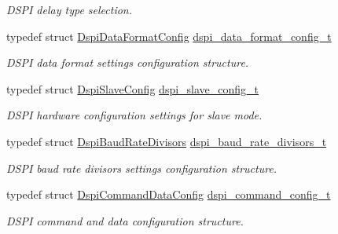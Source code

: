 \begin{DoxyCompactItemize}
\begin{DoxyCompactList}\small\item\em D\+S\+PI delay type selection. \end{DoxyCompactList}\item 
typedef struct \hyperlink{structDspiDataFormatConfig}{Dspi\+Data\+Format\+Config} \hyperlink{group__dspi__hal_ga0eeb6e5b9b331a951edcf24c269bdfcd}{dspi\+\_\+data\+\_\+format\+\_\+config\+\_\+t}
\begin{DoxyCompactList}\small\item\em D\+S\+PI data format settings configuration structure. \end{DoxyCompactList}\item 
typedef struct \hyperlink{structDspiSlaveConfig}{Dspi\+Slave\+Config} \hyperlink{group__dspi__hal_gad42506023f30bef1b75fbda14adc91c3}{dspi\+\_\+slave\+\_\+config\+\_\+t}
\begin{DoxyCompactList}\small\item\em D\+S\+PI hardware configuration settings for slave mode. \end{DoxyCompactList}\item 
typedef struct \hyperlink{structDspiBaudRateDivisors}{Dspi\+Baud\+Rate\+Divisors} \hyperlink{group__dspi__hal_ga6426ca15a4ec2fd17077db5a401737e5}{dspi\+\_\+baud\+\_\+rate\+\_\+divisors\+\_\+t}
\begin{DoxyCompactList}\small\item\em D\+S\+PI baud rate divisors settings configuration structure. \end{DoxyCompactList}\item 
typedef struct \hyperlink{structDspiCommandDataConfig}{Dspi\+Command\+Data\+Config} \hyperlink{group__dspi__hal_gaaf494c415fa4baf4998efa41992e85ce}{dspi\+\_\+command\+\_\+config\+\_\+t}
\begin{DoxyCompactList}\small\item\em D\+S\+PI command and data configuration structure. \end{DoxyCompactList}\end{DoxyCompactItemize}
